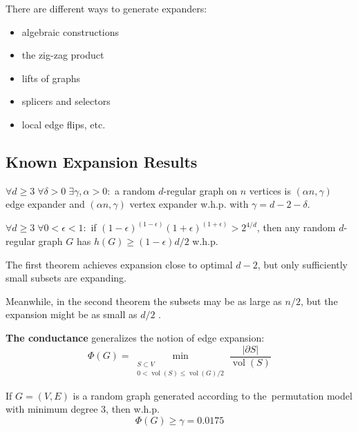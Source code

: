 \documentclass{beamer}
\DeclareMathOperator*{\vol}{vol}
\newcommand{\autotitle}{\secname\ifdefempty{\subsecname}{}{~--- \subsecname}}
\begin{document}
\begin{frame}{\autotitle}
    There are different ways to generate expanders:
    \begin{itemize}
        \item algebraic constructions
        \item the zig-zag product
        \item lifts of graphs
        \item splicers and selectors
        \item local edge flips, etc.
    \end{itemize}
\end{frame}

\subsection{Known Expansion Results}

\begin{frame}{\autotitle}
    \begin{theorem}
        $\forall d\geq3\;\forall \delta>0\;\exists\gamma,\alpha>0:$
        a random $d$-regular graph on $n$ vertices is
        $(\alpha n,\gamma)$ edge expander and $(\alpha n,\gamma)$ vertex expander w.h.p.
        with $\gamma=d-2-\delta$.
    \end{theorem}

    \begin{theorem}
        $\forall d\geq3\;\forall 0<\epsilon<1:$ if
        $(1-\epsilon)^{(1-\epsilon)}(1+\epsilon)^{(1+\epsilon)}>2^{4/d}$,
        then any random $d$-regular graph $G$ has $h(G)\geq(1-\epsilon)d/2$ w.h.p.
    \end{theorem}

    The first theorem achieves expansion close to optimal $d-2$,
    but only sufficiently small subsets are expanding.
    
    Meanwhile, in the second theorem the subsets may be as large as $n/2$,
    but the expansion might be as small as $d/2$ .
\end{frame}

\begin{frame}{\autotitle}
    \textbf{The conductance} generalizes the notion of edge expansion:
    \begin{equation*}
        \Phi(G)=\min_{\substack{S\subset V\\0<\vol(S)\leq \vol(G)/2}}
        \frac{|\partial S|}{\vol(S)}
    \end{equation*}
    \begin{theorem}
        If $G=(V,E)$ is a random graph generated according to
        the~permutation model with minimum degree $3$, then w.h.p.
        \begin{equation*}
            \Phi(G)\geq\gamma=0.0175
        \end{equation*}
    \end{theorem}
\end{frame}
\end{document}
